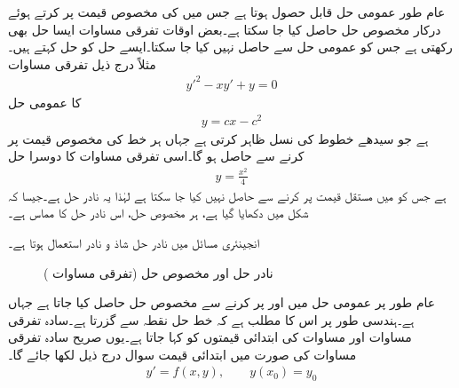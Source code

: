 عام طور عمومی حل قابل حصول ہوتا ہے جس میں  کی مخصوص قیمت پر کرتے ہوئے درکار مخصوص حل حاصل کیا جا سکتا ہے۔بعض اوقات تفرقی مساوات ایسا حل بھی رکھتی ہے جس کو عمومی حل سے حاصل نہیں کیا جا سکتا۔ایسے حل کو  حل کہتے ہیں۔مثلاً درج ذیل تفرقی مساوات
\begin{align}\label{مساوات_ایک_درجی_نادر_مخصوص}
y'^2-xy'+y=0
\end{align}
کا عمومی حل
\begin{align*}
y=cx-c^2
\end{align*}
ہے جو سیدھے خطوط کی نسل ظاہر کرتی ہے جہاں ہر خط  کی مخصوص قیمت  پر کرنے سے حاصل ہو گا۔اسی تفرقی مساوات کا دوسرا حل
\begin{align*}
y=\frac{x^2}{4}
\end{align*}
ہے جس کو  میں مستقل قیمت پر کرنے سے حاصل نہیں کیا جا سکتا ہے لہٰذا یہ نادر حل ہے۔جیسا کہ شکل  میں دکھایا گیا ہے، ہر مخصوص حل، اس نادر حل کا مماس ہے۔

انجینئری مسائل میں نادر حل شاذ و نادر استعمال ہوتا ہے۔ 
\begin{figure}
\centering
{}
\caption{نادر حل اور مخصوص حل (تفرقی مساوات )}
\label{شکل_ایک_درجی_نادر_مخصوص}
\end{figure}
عام طور پر عمومی حل میں   اور  پر کرنے سے مخصوص حل حاصل کیا جاتا ہے جہاں    ہے۔ہندسی طور پر اس کا مطلب ہے کہ خط حل نقطہ  سے گزرتا ہے۔سادہ تفرقی مساوات اور مساوات کی ابتدائی قیمتوں کو  کہا جاتا ہے۔یوں صریح سادہ تفرقی مساوات کی صورت میں ابتدائی قیمت سوال درج ذیل لکھا جائے گا۔
\begin{align}
y'=f(x,y), \quad \quad y(x_0)=y_0
\end{align}

